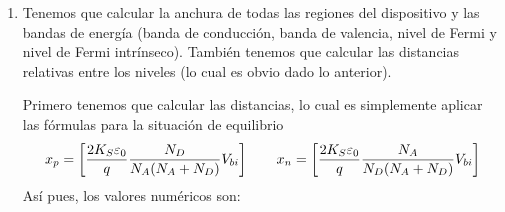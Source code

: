 \begin{enumerate}[label=\alph*)]
    \item Tenemos que calcular la anchura de todas las regiones del dispositivo y las bandas de energía (banda de conducción, banda de valencia, nivel de Fermi y nivel de Fermi intrínseco). También tenemos que calcular las distancias relativas entre los niveles (lo cual es obvio dado lo anterior). 
    
    Primero tenemos que calcular las distancias, lo cual es simplemente aplicar las fórmulas para la situación de equilibrio
    \begin{equation}
        x_p = \left[ \frac{2K_S\varepsilon_0}{q} \frac{N_D}{N_A(N_A+N_D)}  V_{bi} \right]   \qquad 
        x_n = \left[ \frac{2K_S\varepsilon_0}{q} \frac{N_A}{N_D(N_A+N_D)}  V_{bi} \right]
    \end{equation}
    Así pues, los valores numéricos son: 


\end{enumerate}
